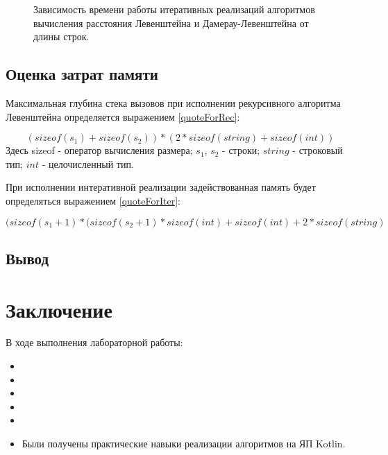 \documentclass[12pt]{report}
\begin{document}
\begin{figure}[h]
	\begin{center}
	\captionsetup{justification=centering}
	\caption{Зависимость времени работы итеративных реализаций алгоритмов вычисления расстояния Левенштейна и Дамерау-Левенштейна от длины строк.}
	\label{IterTime}
	\end{center}
\end{figure}

\section{Оценка затрат памяти}
Максимальная глубина стека вызовов при исполнении рекурсивного алгоритма Левенштейна определяется выражением \ref{quoteForRec}:

\begin{equation}
\label{quoteForRec}
(sizeof(s_{1}) + sizeof(s_{2})) * (2 * sizeof(string) + sizeof(int))
\end{equation}
Здесь sizeof - оператор вычисления размера; $s_{1}$, $s_{2}$ - строки; $string$ - строковый тип; $int$ - целочисленный тип.

При исполнении интеративной реализации задействованная память будет определяться выражением \ref{quoteForIter}:

\begin{equation}
\label{quoteForIter}
(sizeof(s_{1} + 1) * (sizeof(s_{2} + 1) * sizeof(int) + sizeof(int) + 2 * sizeof(string)
\end{equation}

\section*{Вывод}

\chapter*{Заключение}
В ходе выполнения лабораторной работы:
\begin{itemize}
\item 
\item 
\item 
\item 
\item 
\item Были получены практические навыки реализации алгоритмов на ЯП Kotlin.
\end{itemize}
\newpage

\end{document}
